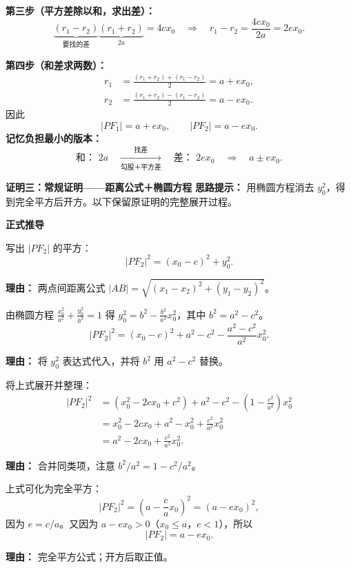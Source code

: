 \begin{proofbox}
\textbf{第三步（平方差除以和，求出差）：}
\[
 \underbrace{(r_1-r_2)}_{\text{要找的差}}
 \underbrace{(r_1+r_2)}_{2a}=4cx_0
 \quad\Longrightarrow\quad
 r_1-r_2=\frac{4cx_0}{2a}=2ex_0.
\]

\textbf{第四步（和差求两数）：}
\[
 \begin{aligned}
 r_1&=\frac{(r_1+r_2)+(r_1-r_2)}2=a+ex_0,\\
 r_2&=\frac{(r_1+r_2)-(r_1-r_2)}2=a-ex_0.
 \end{aligned}
\]
因此
\[
 \boxed{|PF_1|=a+ex_0,\qquad |PF_2|=a-ex_0}.
\]
\textbf{记忆负担最小的版本：}
\[
 \boxed{\text{和： }2a\quad\xrightarrow[\text{勾股＋平方差}]{\text{找差}}\quad
 \text{差： }2ex_0\quad\Longrightarrow\quad a\pm ex_0.}
\]

\medskip
\textbf{\textcolor{CProof}{证明三：常规证明——距离公式＋椭圆方程}}
\textbf{思路提示：} 用椭圆方程消去 $y_0^2$，得到完全平方后开方。以下保留原证明的完整展开过程。

\textbf{\textcolor{CProof}{正式推导}}
	\begin{description}[style=nextline, leftmargin=2.8em, labelsep=0.5em, itemsep=0.55em]
		\item[\textbf{步骤一（平方展开）：}] 写出 $|PF_2|$ 的平方：
			\[
				|PF_2|^2 = (x_0 - c)^2 + y_0^2.
			\]
			\par\textbf{理由：} 两点间距离公式 $|AB| = \sqrt{(x_1-x_2)^2+(y_1-y_2)^2}$。

		\item[\textbf{步骤二（代入消元）：}] 由椭圆方程 $\frac{x_0^2}{a^2}+\frac{y_0^2}{b^2}=1$ 得 $y_0^2 = b^2 - \frac{b^2}{a^2}x_0^2$，其中 $b^2 = a^2 - c^2$。
			\[
				|PF_2|^2 = (x_0-c)^2 + a^2 - c^2 - \frac{a^2-c^2}{a^2}x_0^2.
			\]
			\par\textbf{理由：} 将 $y_0^2$ 表达式代入，并将 $b^2$ 用 $a^2-c^2$ 替换。

		\item[\textbf{步骤三（合并化简）：}] 将上式展开并整理：
			\[
				\begin{aligned}
					|PF_2|^2 &= (x_0^2 - 2c x_0 + c^2) + a^2 - c^2 - \left(1-\frac{c^2}{a^2}\right)x_0^2 \\
					&= x_0^2 - 2c x_0 + a^2 - x_0^2 + \frac{c^2}{a^2}x_0^2 \\
					&= a^2 - 2c x_0 + \frac{c^2}{a^2}x_0^2.
			\end{aligned}
			\]
			\par\textbf{理由：} 合并同类项，注意 $b^2/a^2 = 1-c^2/a^2$。

		\item[\textbf{步骤四（配方开方）：}] 上式可化为完全平方：
			\[
				|PF_2|^2 = \left(a - \frac{c}{a} x_0\right)^2 = (a - e x_0)^2,
			\]
			因为 $e = c/a$。又因为 $a - e x_0 > 0$（$x_0 \le a$，$e<1$），所以
			\[
				|PF_2| = a - e x_0.
			\]
			\par\textbf{理由：} 完全平方公式；开方后取正值。


\end{description}
\end{proofbox}
